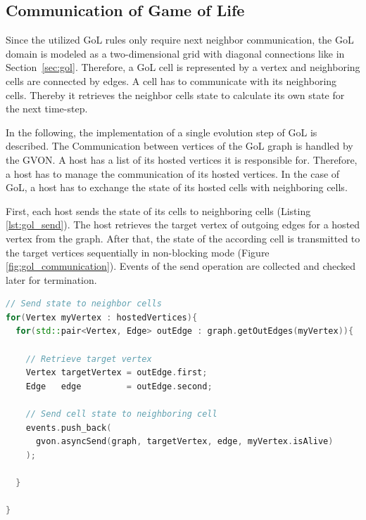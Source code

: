 \subsection{Communication of Game of Life}
\label{sec:gol_imp}
Since the utilized GoL rules only require next neighbor communication,
the GoL domain is modeled as a two-dimensional grid with diagonal
connections like in Section~\ref{sec:gol}. Therefore, a GoL cell is
represented by a vertex and neighboring cells are connected by
edges. A cell has to communicate with its neighboring cells. Thereby
it retrieves the neighbor cells state to calculate its own state for
the next time-step.

In the following, the implementation of a single evolution step of GoL
is described. The Communication between vertices of the GoL graph
is handled by the GVON. A host has a list of its hosted vertices it is
responsible for. Therefore, a host has to manage the communication of its
hosted vertices. In the case of GoL, a host has to exchange the state
of its hosted cells with neighboring cells.

First, each host sends the state of its cells to neighboring
cells (Listing \ref{lst:gol_send}). The host retrieves the target
vertex of outgoing edges for a hosted vertex from the graph. After that,
the state of the according cell is transmitted to the target vertices
sequentially in non-blocking mode (Figure
\ref{fig:gol_communication}). Events of the send operation are
collected and checked later for termination.

\begin{lstlisting}[language=C++, label=lst:gol_send, caption={\ }]
// Send state to neighbor cells
for(Vertex myVertex : hostedVertices){
  for(std::pair<Vertex, Edge> outEdge : graph.getOutEdges(myVertex)){

    // Retrieve target vertex
    Vertex targetVertex = outEdge.first;
    Edge   edge         = outEdge.second;

    // Send cell state to neighboring cell
    events.push_back(
      gvon.asyncSend(graph, targetVertex, edge, myVertex.isAlive)
    );

  }

}
\end{lstlisting}


